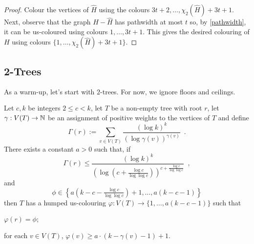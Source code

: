 \documentclass[kpfonts]{patmorin}
\newcommand{\uqs}{\chi_2}
\begin{document}
\begin{proof}
    Colour the vertices of $\hat{H}$ using the colours $3t+2,\ldots,\uqs(\hat{H})+3t+1$.  Next, observe that the graph $H-\hat{H}$ has pathwidth at most $t$ so, by \cref{pathwidth}, it can be us-coloured using colours $1,\ldots,3t+1$.  This gives the desired colouring of $H$ using colours $\{1,\ldots,\uqs(\hat{H})+3t+1\}$.
\end{proof}


\subsection{2-Trees}

As a warm-up, let's start with $2$-trees.  For now, we ignore floors and ceilings.

\begin{lem}\label{tree-slack}
Let $c,k$ be integers $2\le c< k$, let $T$ be a non-empty tree with root $r$,  let $\gamma:V(T)\to\mathbb{N}$ be an assignment of positive weights to the vertices of $T$ and define
\[
    \Gamma(r):=\sum_{v\in V(T)} \frac{(\log k)^k}{(\log \gamma(v))^{\gamma(v)}} \enspace .
\]
There exists a constant $a>0$ such that,
if
\begin{equation}
     \Gamma(r) \le \frac{(\log k)^k}{\left(\log \left(c+\tfrac{\log c}{\log\log c}\right)\right)^{c+\tfrac{\log c}{\log\log c}}} \enspace , \label{total-weight-i}
\end{equation}
and
\begin{equation}
    \phi\in\left\{a\left(k-c-\tfrac{\log c}{\log\log c}\right)+1,\ldots,a(k-c-1)\right\} \label{phi-bound}
\end{equation}
then $T$ has a humped us-colouring $\varphi:V(T)\to\{1,\ldots,a(k-c-1)\}$ such that
\begin{compactenum}[(P1)]
    \item $\varphi(r)=\phi$;
    \item for each $v\in V(T)$, $\varphi(v)\ge a\cdot(k-\gamma(v)-1)+1$.
\end{compactenum}
\end{lem}
\end{document}
